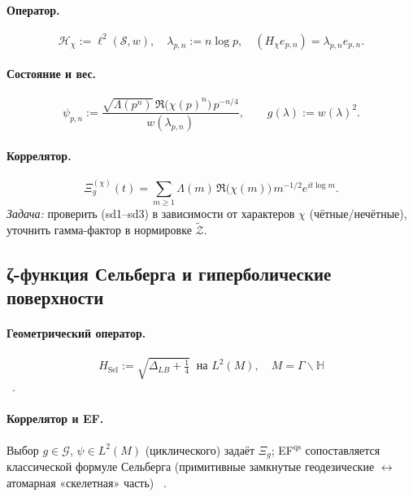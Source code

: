 \documentclass{article}
\numberwithin{equation}{section}
\theoremstyle{plain}
\theoremstyle{definition}
\theoremstyle{remark}
\def\leftrightarrow{↔}%
\begin{document}
\paragraph{Оператор.}
\begin{equation}
\mathcal H_\chi:=\ell^2(\mathcal S,w),\quad \lambda_{p,n}:=n\log p,\quad
(H_\chi e_{p,n})=\lambda_{p,n}e_{p,n}.
\end{equation}
\paragraph{Состояние и вес.}
\begin{equation}
\psi_{p,n}:=\frac{\sqrt{\Lambda(p^n)}\,\Re\!\big(\chi(p)^n\big)\,p^{-n/4}}{w(\lambda_{p,n})},\qquad g(\lambda):=w(\lambda)^2.
\end{equation}
\paragraph{Коррелятор.}
\begin{equation}
\Xi^{(\chi)}_g(t)=\sum_{m\ge 1}\Lambda(m)\,\Re\!\big(\chi(m)\big)\,m^{-1/2}e^{it\log m}.
\end{equation}
\emph{Задача:} проверить (sd1–sd3) в зависимости от характеров \(\chi\) (чётные/нечётные), уточнить гамма-фактор в нормировке \(\widetilde{\mathcal Z}\).

\subsection*{ζ-функция Сельберга и гиперболические поверхности}
\paragraph{Геометрический оператор.}
\begin{equation}
H_{\mathrm{Sel}}:=\sqrt{\Delta_{LB}+\tfrac14}\ \text{ на } L^2(M),\quad M=\Gamma\backslash\mathbb H 
\end{equation}~\cite{Selberg1956, Terras2013}.
\paragraph{Коррелятор и EF.}
Выбор \(g\in\mathcal G\), \(\psi\in L^2(M)\) (циклического) задаёт \(\Xi_g\); EF\(^{\mathrm{qs}}\) сопоставляется классической формуле Сельберга (примитивные замкнутые геодезические \(\leftrightarrow\) атомарная «скелетная» часть) ~\cite{Voros1987, Hecke1944}.

\end{document}
